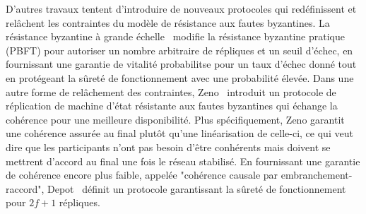 {%

D'autres travaux tentent d'introduire de nouveaux protocoles qui redéfinissent et relâchent les contraintes du modèle
de résistance aux fautes byzantines. La résistance byzantine à grande échelle~\cite{rodrigues2007large} modifie la
résistance byzantine pratique (PBFT) pour autoriser un nombre arbitraire de répliques et un seuil d'échec, en
fournissant une garantie de vitalité probabilitse pour un taux d'échec donné tout en protégeant la sûreté de
fonctionnement avec une probabilité élevée. Dans une autre forme de relâchement des contraintes,
Zeno~\cite{singh2009zeno} introduit un protocole de réplication de machine d'état résistante aux fautes byzantines qui
échange la cohérence pour une meilleure disponibilité. Plus spécifiquement, Zeno garantit une cohérence assurée au final
plutôt qu'une linéarisation de celle-ci, ce qui veut dire que les participants n'ont pas besoin d'être conhérents mais
doivent se mettrent d'accord au final une fois le réseau stabilisé. En fournissant une garantie de cohérence encore
plus faible, appelée "cohérence causale par embranchement-raccord", Depot~\cite{mahajan2011depot} définit un protocole
garantissant la sûreté de fonctionnement pour $2f+1$ répliques.

}
